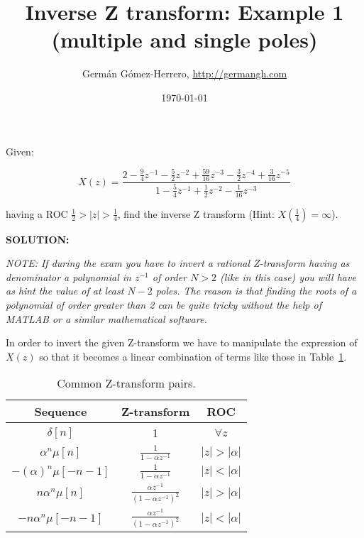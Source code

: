 \documentclass[a4paper,12pt,oneside]{article}
\title{Inverse Z transform: Example 1 (multiple and single poles)}
\date{\today}
\author{Germ\'an G\'omez-Herrero, \url{http://germangh.com}}
\begin{document}
\maketitle

Given:

\[ 
X(z)=\frac{2-\frac{9}{4}z^{-1}-\frac{5}{2}z^{-2}+\frac{59}{16}z^{-3}-\frac{3}{2}z^{-4}+\frac{3}{16}z^{-5}}{1-\frac{5}{4}z^{-1}+\frac{1}{2}z^{-2}-\frac{1}{16}z^{-3}}
\]

having a ROC $\frac{1}{2}>|z|>\frac{1}{4}$, find the inverse Z transform (Hint: $X(\frac{1}{4})=\infty$).

\vspace{1cm}

\textbf{SOLUTION:}

\emph{NOTE: If during the exam you have to invert a rational Z-transform having as denominator a polynomial in $z^{-1}$ of order $N>2$ (like in this case) you will have as hint the value of at least $N-2$ poles. The reason is that finding the roots of a polynomial of order greater than 2 can be quite tricky without the help of MATLAB or a similar mathematical software.}

In order to invert the given Z-transform we have to manipulate the expression of $X(z)$ so that it becomes a linear combination of terms like those in Table~\ref{commonz}.

\begin{table}
\centering
\begin{tabular}{ccc}
\hline
Sequence & Z-transform & ROC\\
\hline
$\delta[n]$ & 1 & $\forall z$\vspace{.2cm}\\
$\alpha^n\mu[n]$ &  $\frac{1}{1-\alpha z^{-1}}$ & $|z|>|\alpha|$\vspace{.2cm}\\
$-(\alpha)^{n}\mu[-n-1]$ & $\frac{1}{1-\alpha z^{-1}}$ & $|z|<|\alpha|$\vspace{.2cm}\\
$n \alpha^n \mu[n]$ & $\frac{\alpha z^{-1}}{(1-\alpha z^{-1})^2}$ & $|z|>|\alpha|$\vspace{.2cm}\\
$-n\alpha^n \mu[-n-1]$ & $\frac{\alpha z^{-1}}{(1-\alpha z^{-1})^2}$ & $|z|<|\alpha|$\vspace{.2cm}\\
\hline
\end{tabular}
\caption{Common Z-transform pairs.}
\label{commonz}
\end{table}
\end{document}

